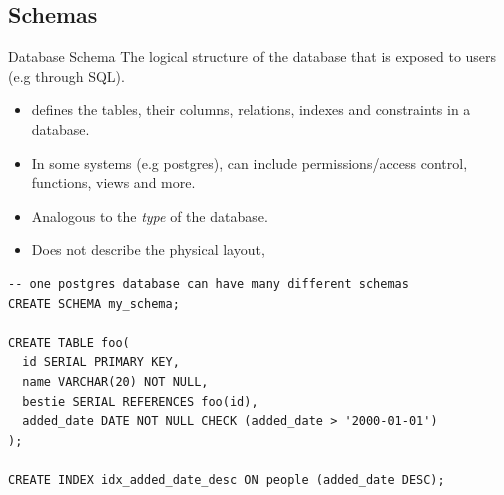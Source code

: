 \subsection{Schemas}
\begin{definitionbox}{Database Schema}
  The logical structure of the database that is exposed to users (e.g through SQL).
  \begin{itemize}
    \item defines the tables, their columns, relations, indexes and constraints in a database.
    \item In some systems (e.g postgres), can include permissions/access control, functions, views and more.
    \item Analogous to the \textit{type} of the database.
    \item Does not describe the physical layout,
  \end{itemize}
  \begin{verbatim}
-- one postgres database can have many different schemas
CREATE SCHEMA my_schema; 

CREATE TABLE foo(
  id SERIAL PRIMARY KEY,
  name VARCHAR(20) NOT NULL,
  bestie SERIAL REFERENCES foo(id),
  added_date DATE NOT NULL CHECK (added_date > '2000-01-01')
);

CREATE INDEX idx_added_date_desc ON people (added_date DESC);
  \end{verbatim}
\end{definitionbox}



